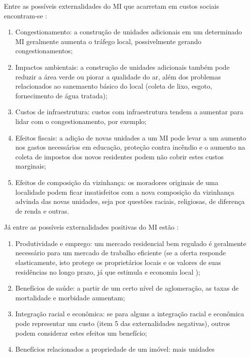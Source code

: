 \documentclass[
	12pt,				%
	oneside,			%
	a4paper,			%
	chapter=TITLE,		%
	section=TITLE,		%
	english,			%
	brazil				%
	]{abntex2}
\begin{document}
\begin{refsection}
Entre as possíveis externalidades do \gls{MI} que acarretam em custos sociais
encontram-se \autocite[p.~210-211]{externalities}:
\begin{enumerate}
\def\labelenumi{\arabic{enumi}.}
\tightlist
\item
  Congestionamento: a construção de unidades adicionais em um determinado
  \gls{MI} geralmente aumenta o tráfego local, possivelmente gerando congestionamentos;
\item
  Impactos ambientais: a construção de unidades adicionais também pode reduzir
  a área verde ou piorar a qualidade do ar, além dos problemas relacionados ao
  sanemaento básico do local (coleta de lixo, esgoto, fornecimento de água tratada);
\item
  Custos de infraestrutura: custos com infraestrutura tendem a aumentar para
  lidar com o congestionamento, por exemplo;
\item
  Efeitos fiscais: a adição de novas unidades a um \gls{MI} pode levar a um
  aumento nos gastos necessários em educação, proteção contra incêndio e o aumento
  na coleta de impostos dos novos residentes podem não cobrir estes custos
  marginais;
\item
  Efeitos de composição da vizinhança: os moradores originais de uma localidade
  podem ficar insatisfeitos com a nova composição da vizinhança advinda das novas
  unidades, seja por questões raciais, religiosas, de diferença de renda e outras.
\end{enumerate}
Já entre as possíveis externalidades positivas do \gls{MI} estão
\autocite[p.~212]{externalities}:
\begin{enumerate}
\def\labelenumi{\arabic{enumi}.}
\tightlist
\item
  Produtividade e emprego: um mercado residencial bem regulado é geralmente
  necessário para um mercado de trabalho eficiente (se a oferta responde
  elasticamente, isto protege os proprietários locais e os valores de suas
  residências no longo prazo, já que estimula e economia local \autocite[p.~9]{HDT});
\item
  Benefícios de saúde: a partir de um certo nível de aglomeração, as taxas de
  mortalidade e morbidade aumentam;
\item
  Integração racial e econômica: se para alguns a integração racial e econômica
  pode representar um custo (item 5 das externalidades negativas), outros podem
  considerar estes efeitos um benefício;
\item
  Benefícios relacionados a propriedade de um imóvel: mais unidades

\end{enumerate}
\end{refsection}
\end{document}
